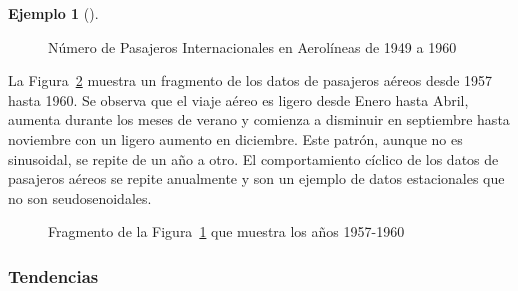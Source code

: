 \documentclass[
  us-letterpaper,
]{scrreprt}
\theoremstyle{plain}
\theoremstyle{definition}
\theoremstyle{definition}
\newtheorem{example}{Ejemplo}[chapter]
\theoremstyle{plain}
\theoremstyle{remark}
\begin{document}
\begin{example}[]
\begin{tcolorbox}
\begin{figure}[H]
{}

\caption{\label{fig-airpass}Número de Pasajeros Internacionales en
Aerolíneas de 1949 a 1960}

\end{figure}%

La Figura~\ref{fig-airfrag} muestra un fragmento de los datos de
pasajeros aéreos desde 1957 hasta 1960. Se observa que el viaje aéreo es
ligero desde Enero hasta Abril, aumenta durante los meses de verano y
comienza a disminuir en septiembre hasta noviembre con un ligero aumento
en diciembre. Este patrón, aunque no es sinusoidal, se repite de un año
a otro. El comportamiento cíclico de los datos de pasajeros aéreos se
repite anualmente y son un ejemplo de datos estacionales que no son
seudosenoidales.

\begin{figure}[H]


\caption{\label{fig-airfrag}Fragmento de la Figura~\ref{fig-airpass} que
muestra los años 1957-1960}

\end{figure}%

\end{tcolorbox}

\end{example}

\subsubsection{Tendencias}\label{sec-trend}
\end{document}
